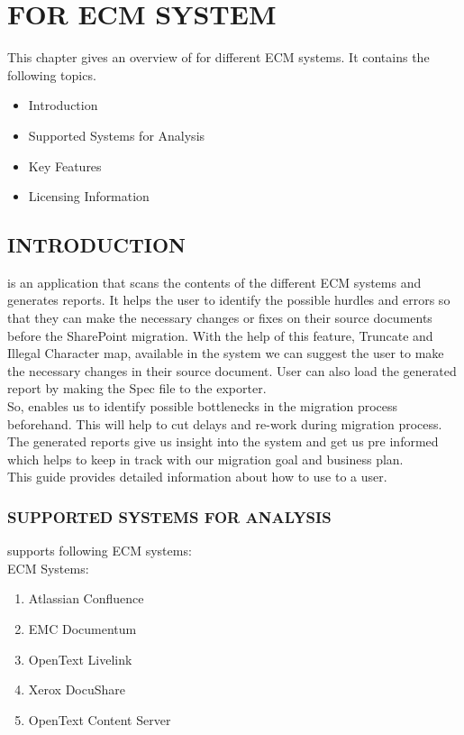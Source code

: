 \chapter{\MakeUppercase{\appName} FOR ECM SYSTEM}
This chapter gives an overview of \appName for different ECM systems. It contains the following topics.
\begin{itemize}
  \item Introduction
  \item Supported Systems for Analysis
  \item Key Features
  \item Licensing Information
\end{itemize}
 \section{INTRODUCTION}
 \appName is an application that scans the contents of the different ECM systems and generates reports. It helps the user to identify the possible hurdles and errors so that they can make the necessary changes or fixes on their source documents before the SharePoint migration. With the help of this feature, Truncate and Illegal Character map, available in the system we can suggest the user to make the necessary changes in their source document. User can also load the generated report by making the Spec file to the exporter.
 \\
So, \appName enables us to identify possible bottlenecks in the migration process beforehand. This will help to cut delays and re-work during migration process. The generated reports give us insight into the system and get us pre informed which helps to keep in track with our migration goal and business plan.
 \\
This guide provides detailed information about how to use \appName to a user.
\subsection{SUPPORTED SYSTEMS FOR ANALYSIS}
\appName supports following ECM systems:
 \\
ECM Systems:
 \\
\begin{enumerate}
  \item Atlassian Confluence
  \item EMC Documentum
  \item OpenText Livelink
  \item Xerox DocuShare
  \item OpenText Content Server
\end{enumerate}
